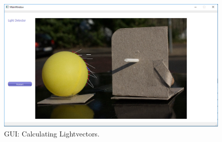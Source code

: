 \begin{figure} [H]
	\center 
	\includegraphics[width=15cm]{Images/06Gui.PNG}			
	\caption[GUI: Calculating Lightvectors.]{GUI: Calculating Lightvectors.}
	\label{fig:Gui04}
\end{figure}


\newpage

























